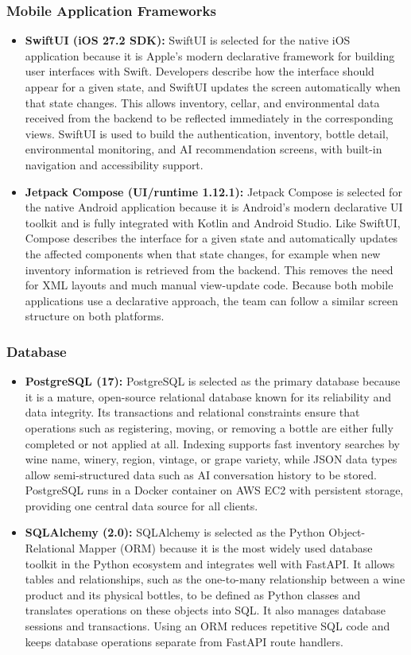 \documentclass[conference]{IEEEtran}
\begin{document}
\subsubsection{Mobile Application Frameworks}
\begin{itemize}
    \item \textbf{SwiftUI (iOS 27.2 SDK):} SwiftUI is selected for the native iOS application because it is Apple's modern declarative framework for building user interfaces with Swift. Developers describe how the interface should appear for a given state, and SwiftUI updates the screen automatically when that state changes. This allows inventory, cellar, and environmental data received from the backend to be reflected immediately in the corresponding views. SwiftUI is used to build the authentication, inventory, bottle detail, environmental monitoring, and AI recommendation screens, with built-in navigation and accessibility support.
    \item \textbf{Jetpack Compose (UI/runtime 1.12.1):} Jetpack Compose is selected for the native Android application because it is Android's modern declarative UI toolkit and is fully integrated with Kotlin and Android Studio. Like SwiftUI, Compose describes the interface for a given state and automatically updates the affected components when that state changes, for example when new inventory information is retrieved from the backend. This removes the need for XML layouts and much manual view-update code. Because both mobile applications use a declarative approach, the team can follow a similar screen structure on both platforms.
\end{itemize}

\subsubsection{Database}
\begin{itemize}
    \item \textbf{PostgreSQL (17):} PostgreSQL is selected as the primary database because it is a mature, open-source relational database known for its reliability and data integrity. Its transactions and relational constraints ensure that operations such as registering, moving, or removing a bottle are either fully completed or not applied at all. Indexing supports fast inventory searches by wine name, winery, region, vintage, or grape variety, while JSON data types allow semi-structured data such as AI conversation history to be stored. PostgreSQL runs in a Docker container on AWS EC2 with persistent storage, providing one central data source for all clients.
    \item \textbf{SQLAlchemy (2.0):} SQLAlchemy is selected as the Python Object-Relational Mapper (ORM) because it is the most widely used database toolkit in the Python ecosystem and integrates well with FastAPI. It allows tables and relationships, such as the one-to-many relationship between a wine product and its physical bottles, to be defined as Python classes and translates operations on these objects into SQL. It also manages database sessions and transactions. Using an ORM reduces repetitive SQL code and keeps database operations separate from FastAPI route handlers.
\end{itemize}
\end{document}
